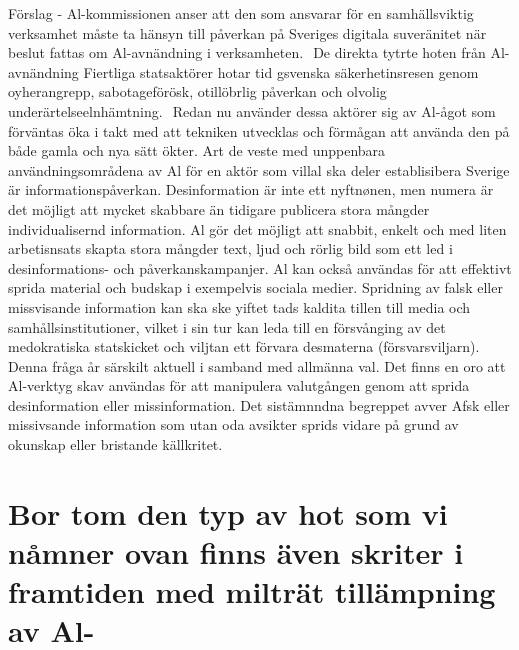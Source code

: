 {{{{{{{{Förslag
- Al-kommissionen anser att den som ansvarar för en samhällsviktig verksamhet måste ta hänsyn till påverkan på Sveriges digitala suveränitet när beslut fattas om Al-avnändning i verksamheten. \({ }^{}\)
De direkta tytrte hoten från Al-avnändning Fiertliga statsaktörer hotar tid gsvenska säkerhetinsresen genom oyherangrepp, sabotageförösk, otillöbrlig påverkan och olvolig underärtelseelnhämtning. \({ }^{}\) Redan nu använder dessa aktörer sig av Al-ågot som förväntas öka i takt med att tekniken utvecklas och förmågan att använda den på både gamla och nya sätt ökter. Art de veste med unppenbara användningsområdena av Al för en aktör som villal ska deler establisibera Sverige är informationspåverkan. Desinformation är inte ett nyftnønen, men numera är det möjligt att mycket skabbare än tidigare publicera stora mångder individualisernd information.
Al gör det möjligt att snabbit, enkelt och med liten arbetisnsats skapta stora mångder text, ljud och rörlig bild som ett led i desinformations- och påverkanskampanjer. Al kan också användas för att effektivt sprida material och budskap i exempelvis sociala medier. Spridning av falsk eller missvisande information kan ska ske yiftet tads kaldita tillen till media och samhållsinstitutioner, vilket i sin tur kan leda till en försvånging av det medokratiska statskicket och viljtan ett förvara desmaterna (försvarsviljarn). \({ }^{}\) Denna fråga år särskilt aktuell i samband med allmänna val. Det finns en oro att Al-verktyg skav användas för att manipulera valutgången genom att sprida desinformation eller missinformation. Det sistämnndna begreppet avver Afsk eller missivsande information som utan oda avsikter sprids vidare på grund av okunskap eller bristande källkritet.
\section*{Bor tom den typ av hot som vi nåmner ovan finns även skriter i framtiden med milträt tillämpning av Al-}

}}}}}}}}
